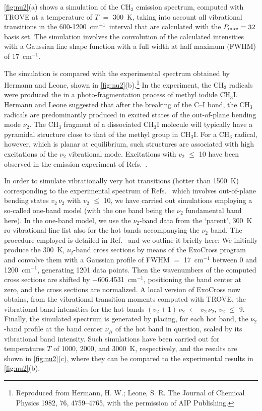 \documentclass{achemso}
\newcommand{\3}{$_{3}$}
\newcommand{\cm}{cm$^{-1}$}
\begin{document}
\ref{fig:nu2}(a)  shows a simulation of the CH$_3$ emission spectrum, computed with
TROVE at a temperature of $T$ $=$ 300~K, taking into account all vibrational transitions
in the 600-1200~\cm\ interval that are calculated with the $P_{\rm max} = 32$ basis set. The simulation involves the convolution of the calculated intensities with a Gaussian line shape function with a full width at half maximum (FWHM) of 17~cm$^{-1}$.

The simulation is compared with the experimental spectrum obtained by
Hermann and Leone\cite{nu2_82a,nu2_82b}, shown in
\ref{fig:nu2}(b).\footnote{Reproduced from
Hermann, H. W.; Leone, S. R. The Journal of Chemical Physics 1982, 76, 4759--4765,
 with the permission of AIP Publishing.}
 In the experiment, the CH$_3$ radicals
were
produced the in a photo-fragmentation process
of methyl iodide CH$_3$I.
Hermann and Leone\cite{nu2_82a,nu2_82b} suggested that after the breaking of the C--I bond,
 the CH$_3$ radicals are predominantly produced in excited states of the out-of-plane bending mode
 $\nu_2$. The CH$_3$ fragment of a dissociated CH$_3$I molecule will typically have a pyramidal structure close
to that of the methyl group in
  CH$_3$I. For a CH$_3$ radical, however, which is planar at equilibrium, such structures are associated with
high excitations of the $\nu_2$ vibrational mode.
 Excitations with $v_2$ $\leqslant$  10 have been
observed in the
emission experiment
of Refs.~.


In order to simulate vibrationally very hot transitions (hotter than 1500~K) corresponding to
the experimental spectrum of
Refs.~ which involves out-of-plane bending states
 $v_2\, \nu_2$ with $v_2$ $\leqslant$  10, we have carried out simulations employing
a so-called one-band model (with the one band being the $\nu_2$ fundamental band here). In the one-band
model, we use the $\nu_2$-band data from the
`parent',
 300~K
 ro-vibrational line list also for the hot bands accompanying the
 $\nu_2$ band. The procedure employed is detailed in
 Ref.~ and we outline it briefly here:
We initially produce the
 300~K, $\nu_2$-band cross sections by means of the ExoCross program\cite{exocross} and convolve them
with a Gaussian profile of   FWHM $=$ 17~cm$^{-1}$ between 0 and 1200~cm$^{-1}$, generating 1201 data points. Then the
wavenumbers of the computed cross sections are shifted by
$-$606.4531~cm$^{-1}$, positioning the band center at zero, and the cross sections are normalized.
 A local version of ExoCross now obtains,
 from             the vibrational transition moments computed with TROVE,
the vibrational band intensities
for the hot bands
 $(v_2+1)\, \nu_2$ $\leftarrow$
 $v_2\, \nu_2$,
 $v_2$ $\leqslant$ 9. Finally, the simulated spectrum is generated  by placing,
for each hot band,
 the $\nu_2$-band profile
at the band center $\nu_{fi}$ of the hot band in question, scaled by its
vibrational band intensity.
Such simulations have been carried out for
 temperatures $T$ of  1000, 2000, and 3000~K, respectively, and the results are shown in
\ref{fig:nu2}(c),
   where they can be compared to the experimental results\cite{nu2_82a,nu2_82b}
in
\ref{fig:nu2}(b).
\end{document}
